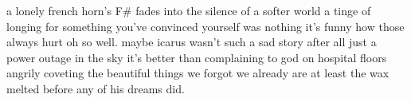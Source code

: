 \documentclass[12pt]{article}
\begin{document}
a lonely french horn’s F# fades into the silence of a softer world\newline
a tinge of longing for something you’ve convinced yourself was nothing\newline
it’s funny how those always hurt oh so well{}.\newline
\newline
\newline
maybe icarus wasn’t such a sad story after all\newline
just a power outage in the sky\newline
it’s better than complaining to god on hospital floors\newline
angrily coveting the beautiful things we forgot we already are\newline
at least the wax melted\newline
before any of his dreams did.\newline
\end{document}
